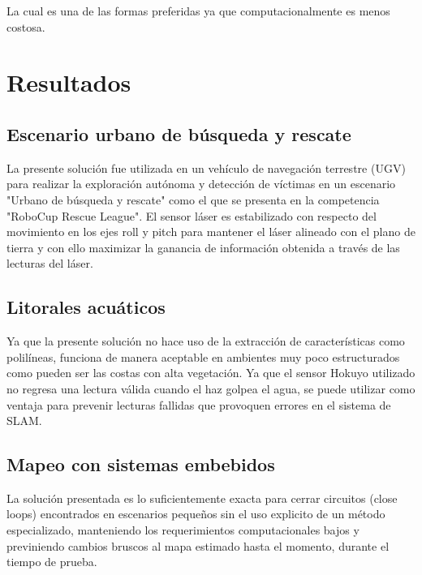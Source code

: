 \documentclass[10pt,a4paper]{article}
\begin{document}
La cual es una de las formas preferidas ya que computacionalmente es menos costosa.

\section{Resultados}

\subsection{Escenario urbano de búsqueda y rescate}

La presente solución fue utilizada en un vehículo de navegación terrestre (UGV) para realizar la exploración autónoma y detección de víctimas en un escenario "Urbano de búsqueda y rescate" como el que se presenta en la competencia "RoboCup Rescue League". El sensor láser es estabilizado con respecto del movimiento en los ejes roll y pitch para mantener el láser alineado con el plano de tierra y con ello maximizar la ganancia de información obtenida a través de las lecturas del láser.

\subsection{Litorales acuáticos}

Ya que la presente solución no hace uso de la extracción de características como polilíneas, funciona de manera aceptable en ambientes muy poco estructurados como pueden ser las costas con alta vegetación. Ya que el sensor Hokuyo utilizado no regresa una lectura válida cuando el haz golpea el agua, se puede utilizar como ventaja para prevenir lecturas fallidas que provoquen errores en el sistema de SLAM.

\subsection{Mapeo con sistemas embebidos}

La solución presentada es lo suficientemente exacta para cerrar circuitos (close loops) encontrados en escenarios pequeños sin el uso explicito de un método especializado, manteniendo los requerimientos computacionales bajos y previniendo cambios bruscos al mapa estimado hasta el momento, durante el tiempo de prueba.

\end{document}
